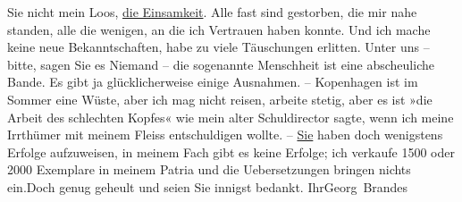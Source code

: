 \begin{ledgroupsized}[t]{13cm}
               Sie nicht mein Loos, \uline{die Einsamkeit}. Alle fast sind
               gestorben, die mir nahe standen, alle {\pb}die wenigen, an die ich Vertrauen
               haben konnte. Und ich mache keine neue Bekanntschaften, habe zu viele Täuschungen
               erlitten. Unter uns – bitte, sagen Sie es Niemand – die sogenannte Menschheit ist
               eine abscheuliche Bande. Es gibt ja glücklicherweise einige Ausnahmen. – Kopenhagen ist im Sommer eine Wüste, aber ich mag
               nicht reisen, arbeite stetig, aber es ist »die Arbeit des schlechten Kopfes« wie mein
               alter Schuldirector sagte, wenn
               ich meine Irrthümer mit meinem Fleiss entschuldigen wollte. – \uline{Sie} haben doch wenigstens Erfolge aufzuweisen, in meinem Fach gibt es
               keine Erfolge; ich verkaufe 1500 oder 2000 Exemplare in meinem Patria und die
               Uebersetzungen bringen nichts ein.\hspace*{2em}Doch genug
               geheult und seien Sie innigst bedankt. Ihr\spacefill\mbox{Georg Brandes}\pend
           
         
         \endnumbering{}\end{ledgroupsized}  \newcommand{\dateiname}{L02445}\newcommand{\titel}{Georg Brandes an Arthur Schnitzler, 12. 7. 1925}\newcommand{\editorInnen}{Martin Anton Müller und Gerd-Hermann Susen}
      